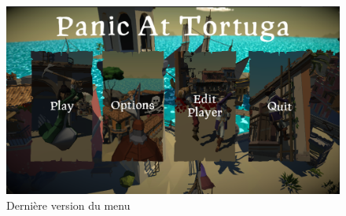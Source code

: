             \begin{figure}[hbt!]
                \centering
                \includegraphics[scale=0.35]{img/menu_principal.png}
                \caption{Dernière version du menu}
            \end{figure}
            \FloatBarrier
        